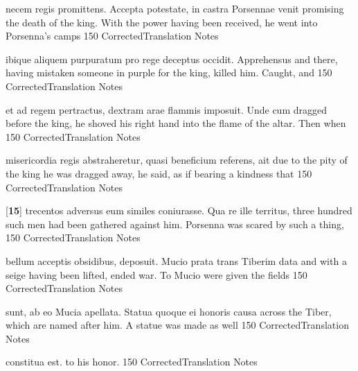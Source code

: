 \latline
  {necem regis promittens.  Accepta potestate, in castra Porsennae venit}
  { promising the death of the king.  With the power having been received, he went into Porsenna's camps }
  {150}
  { CorrectedTranslation }
  { Notes }


\latline
  {ibique aliquem purpuratum pro rege deceptus occidit.  Apprehensus}
  { and there, having mistaken someone in purple for the king, killed him.  Caught, and }
  {150}
  { CorrectedTranslation }
  { Notes }


\latline
  {et ad regem pertractus, dextram arae flammis imposuit.  Unde cum }
  { dragged before the king, he shoved his right hand into the flame of the altar.  Then when  }
  {150}
  { CorrectedTranslation }
  { Notes }


\latline
  {misericordia regis abstraheretur, quasi beneficium referens, ait}
  { due to the pity of the king he was dragged away, he said, as if bearing a kindness that }
  {150}
  { CorrectedTranslation }
  { Notes }


\latline
  {[\textbf{15}] trecentos adversus eum similes coniurasse.  Qua re ille territus,}
  { three hundred such men had been gathered against him.  Porsenna was scared by such a thing, }
  {150}
  { CorrectedTranslation }
  { Notes }


\latline
  {bellum acceptis obsidibus, deposuit.  Mucio prata trans Tiberim data}
  { and with a seige having been lifted, ended war.  To Mucio were given the fields }
  {150}
  { CorrectedTranslation }
  { Notes }


\latline
  {sunt, ab eo Mucia apellata.  Statua quoque ei honoris causa }
  { across the Tiber, which are named after him.  A statue was made as well  }
  {150}
  { CorrectedTranslation }
  { Notes }


\latline
  {constitua est.}
  { to his honor. }
  {150}
  { CorrectedTranslation }
  { Notes }




